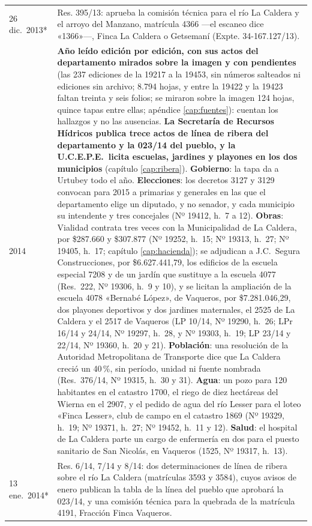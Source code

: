\begin{longtable}{@{}p{2.7cm}p{10.3cm}@{}}
26 dic.\ 2013* & Res. 395/13: aprueba la comisión técnica para el río La Caldera y el arroyo del Manzano, matrícula 4366 ---el escaneo dice «1366»---, Finca La Caldera o Getsemaní (Expte. 34-167.127/13). \\
2014 & \textbf{Año leído edición por edición, con sus actos del departamento mirados sobre la imagen y con pendientes} (las 237 ediciones de la 19217 a la 19453, sin números salteados ni ediciones sin archivo; 8.794 hojas, y entre la 19422 y la 19423 faltan treinta y seis folios; se miraron sobre la imagen 124 hojas, quince tapas entre ellas; apéndice \ref{cap:fuentes}): cuentan los hallazgos y no las ausencias. \textbf{La Secretaría de Recursos Hídricos publica trece actos de línea de ribera del departamento y la 023/14 del pueblo, y la U.C.E.P.E.\ licita escuelas, jardines y playones en los dos municipios} (capítulo \ref{cap:ribera}). \textbf{Gobierno}: la tapa da a Urtubey todo el año. \textbf{Elecciones}: los decretos 3127 y 3129 convocan para 2015 a primarias y generales en las que el departamento elige un diputado, y no senador, y cada municipio su intendente y tres concejales (Nº 19412, h.\ 7 a 12). \textbf{Obras}: Vialidad contrata tres veces con la Municipalidad de La Caldera, por \$287.660 y \$307.877 (Nº 19252, h.\ 15; Nº 19313, h.\ 27; Nº 19405, h.\ 17; capítulo \ref{cap:hacienda}); se adjudican a J.C.\ Segura Construcciones, por \$6.627.441,79, los edificios de la escuela especial 7208 y de un jardín que sustituye a la escuela 4077 (Res.\ 222, Nº 19306, h.\ 9 y 10), y se licitan la ampliación de la escuela 4078 «Bernabé López», de Vaqueros, por \$7.281.046,29, dos playones deportivos y dos jardines maternales, el 2525 de La Caldera y el 2517 de Vaqueros (LP 10/14, Nº 19290, h.\ 26; LPr 16/14 y 24/14, Nº 19297, h.\ 28, y Nº 19303, h.\ 19; LP 23/14 y 22/14, Nº 19360, h.\ 20 y 21). \textbf{Población}: una resolución de la Autoridad Metropolitana de Transporte dice que La Caldera creció un 40\,\%, sin período, unidad ni fuente nombrada (Res.\ 376/14, Nº 19315, h.\ 30 y 31). \textbf{Agua}: un pozo para 120 habitantes en el catastro 1700, el riego de diez hectáreas del Wierna en el 2907, y el pedido de agua del río Lesser para el loteo «Finca Lesser», club de campo en el catastro 1869 (Nº 19329, h.\ 19; Nº 19371, h.\ 27; Nº 19452, h.\ 11 y 12). \textbf{Salud}: el hospital de La Caldera parte un cargo de enfermería en dos para el puesto sanitario de San Nicolás, en Vaqueros (1525, Nº 19317, h.\ 13). \\
13 ene.\ 2014* & Res. 6/14, 7/14 y 8/14: dos determinaciones de línea de ribera sobre el río La Caldera (matrículas 3593 y 3584), cuyos avisos de enero publican la tabla de la línea del pueblo que aprobará la 023/14, y una comisión técnica para la quebrada de la matrícula 4191, Fracción Finca Vaqueros. \\

\end{longtable}
